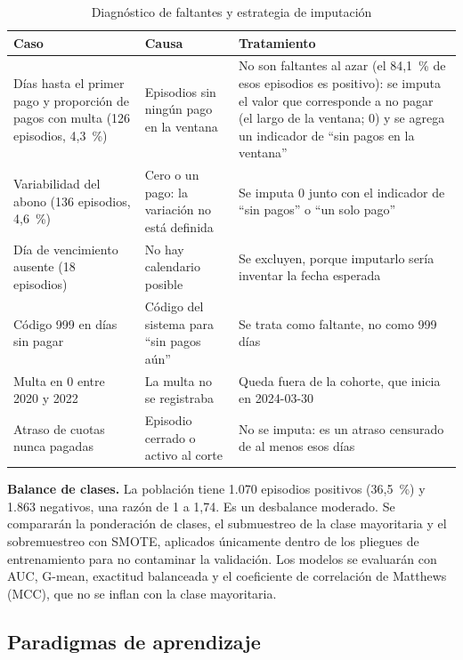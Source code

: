 \documentclass[journal]{IEEEtran}
\begin{document}
\begin{table}[!t]
\caption{Diagnóstico de faltantes y estrategia de imputación}
\label{tab:imputacion}
\centering
\small
\begin{tabularx}{\textwidth}{@{}p{}p{}L@{}}
\toprule
Caso & Causa & Tratamiento \\
\midrule
Días hasta el primer pago y proporción de pagos con multa (126 episodios, 4,3~\%) & Episodios sin ningún pago en la ventana & No son faltantes al azar (el 84,1~\% de esos episodios es positivo): se imputa el valor que corresponde a no pagar (el largo de la ventana; 0) y se agrega un indicador de ``sin pagos en la ventana'' \\
Variabilidad del abono (136 episodios, 4,6~\%) & Cero o un pago: la variación no está definida & Se imputa 0 junto con el indicador de ``sin pagos'' o ``un solo pago'' \\
Día de vencimiento ausente (18 episodios) & No hay calendario posible & Se excluyen, porque imputarlo sería inventar la fecha esperada \\
Código 999 en días sin pagar & Código del sistema para ``sin pagos aún'' & Se trata como faltante, no como 999 días \\
Multa en 0 entre 2020 y 2022 & La multa no se registraba & Queda fuera de la cohorte, que inicia en 2024-03-30 \\
Atraso de cuotas nunca pagadas & Episodio cerrado o activo al corte & No se imputa: es un atraso censurado de al menos esos días \\
\bottomrule
\end{tabularx}
\end{table}

\textbf{Balance de clases.} La población tiene 1.070 episodios positivos (36,5~\%) y 1.863 negativos, una razón de 1 a 1,74. Es un desbalance moderado. Se compararán la ponderación de clases, el submuestreo de la clase mayoritaria y el sobremuestreo con SMOTE, aplicados únicamente dentro de los pliegues de entrenamiento para no contaminar la validación. Los modelos se evaluarán con AUC, G-mean, exactitud balanceada y el coeficiente de correlación de Matthews (MCC), que no se inflan con la clase mayoritaria.

\subsection{Paradigmas de aprendizaje}
\end{document}
